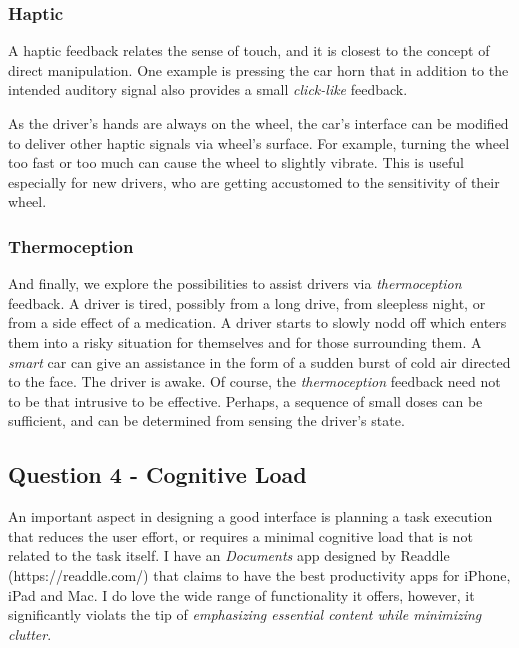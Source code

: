 \documentclass[12pt,letterpaper]{article}
\begin{document}
\subsubsection*{Haptic}
A haptic feedback relates the sense of touch, and it is closest to the concept of direct manipulation. One example is pressing the car horn that in addition to the intended auditory signal also provides a small \textit{click-like} feedback. 

As the driver's hands are always on the wheel, the car's interface can be modified to deliver other haptic signals via wheel's surface. For example, turning the wheel too fast or too much can cause the wheel to slightly vibrate. This is useful especially for new drivers, who are getting accustomed to the sensitivity of their wheel.

\subsubsection*{Thermoception}
And finally, we explore the possibilities to assist drivers via \textit{thermoception} feedback. A driver is tired, possibly from a long drive, from sleepless night, or from a side effect of a medication. A driver starts to slowly nodd off which enters them into a risky situation for themselves and for those surrounding them. A \textit{smart} car can give an assistance in the form of a sudden burst of cold air directed to the face. The driver is awake. Of course, the \textit{thermoception} feedback need not to be that intrusive to be effective. Perhaps, a sequence of small doses can be sufficient, and can be determined from sensing the driver's state. 

\subsection*{Question 4 - Cognitive Load}
An important aspect in designing a good interface is planning a task execution that reduces the user effort, or requires a minimal cognitive load that is not related to the task itself. I have an \textit{Documents} app designed by Readdle (https://readdle.com/) that claims to have the best productivity apps for iPhone, iPad and Mac. I do love the wide range of functionality it offers, however, it significantly violats the tip of \textit{emphasizing essential content while minimizing clutter}.  

 

\end{document}
